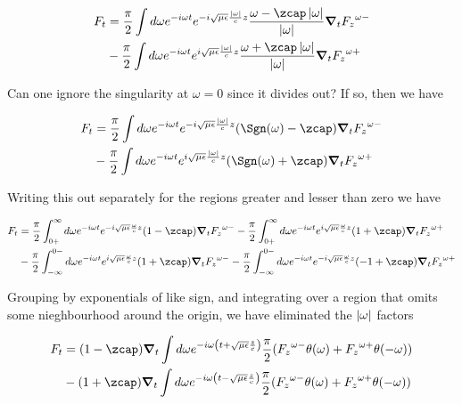 \begin{align*} %
F_t 
&= 
\frac{\pi}{2}
\int d\omega e^{-i\omega t} 
e^{-i \sqrt{\mu\epsilon}\frac{\Abs{\omega}}{c} z}
\frac{\omega -\zcap\Abs{\omega}}{\Abs{\omega}}
\spacegrad_t {F_z}^{\omega-} \\
&
- 
\frac{\pi}{2}
\int d\omega e^{-i\omega t} 
e^{i \sqrt{\mu\epsilon}\frac{\Abs{\omega}}{c} z} 
\frac{\omega +\zcap\Abs{\omega}}{\Abs{\omega}}
\spacegrad_t {F_z}^{\omega+}
\end{align*}

Can one ignore the singularity at $\omega = 0$ since it divides out?  If so, then we have

\begin{align*} %
F_t 
&= 
\frac{\pi}{2}
\int d\omega e^{-i\omega t} 
e^{-i \sqrt{\mu\epsilon}\frac{\Abs{\omega}}{c} z}
(\Sgn(\omega) - \zcap)
\spacegrad_t {F_z}^{\omega-} \\
&
- 
\frac{\pi}{2}
\int d\omega e^{-i\omega t} 
e^{i \sqrt{\mu\epsilon}\frac{\Abs{\omega}}{c} z} 
(\Sgn(\omega) + \zcap)
\spacegrad_t {F_z}^{\omega+}
\end{align*}

Writing this out separately for the regions greater and lesser than zero we have

\begin{align*} %
F_t 
&= 
\frac{\pi}{2}
\int_{0+}^\infty d\omega e^{-i\omega t} 
e^{-i \sqrt{\mu\epsilon}\frac{\omega}{c} z}
(1 - \zcap)
\spacegrad_t {F_z}^{\omega-} 
- 
\frac{\pi}{2}
\int_{0+}^\infty d\omega e^{-i\omega t} 
e^{i \sqrt{\mu\epsilon}\frac{\omega}{c} z} 
(1 + \zcap)
\spacegrad_t {F_z}^{\omega+} \\
&- 
\frac{\pi}{2}
\int_{-\infty}^{0-} d\omega e^{-i\omega t} 
e^{i \sqrt{\mu\epsilon}\frac{\omega}{c} z}
(1 + \zcap)
\spacegrad_t {F_z}^{\omega-} 
- 
\frac{\pi}{2}
\int_{-\infty}^{0-} d\omega e^{-i\omega t} 
e^{-i \sqrt{\mu\epsilon}\frac{\omega}{c} z} 
(-1 + \zcap)
\spacegrad_t {F_z}^{\omega+} \\
\end{align*}

Grouping by exponentials of like sign, and integrating over a region that omits some nieghbourhood around the origin, we have eliminated the $\left\lvert{\omega}\right\rvert$ factors

\begin{align*}%
F_t 
&= 
(1 - \zcap) \spacegrad_t
\int d\omega e^{-i\omega \left(t + \sqrt{\mu\epsilon}\frac{z}{c}\right)}
\frac{\pi}{2}({F_z}^{\omega-}\theta(\omega) + {F_z}^{\omega+}\theta(-\omega)) \\
&-(1 + \zcap) \spacegrad_t
\int d\omega e^{-i\omega \left(t - \sqrt{\mu\epsilon}\frac{z}{c}\right)}
\frac{\pi}{2}({F_z}^{\omega-}\theta(\omega) + {F_z}^{\omega+}\theta(-\omega))
\end{align*}

